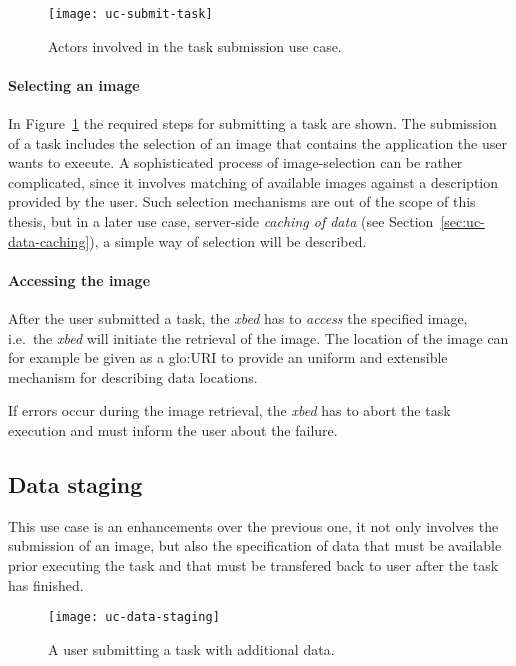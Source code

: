 \begin{figure}[htbp]
  \centering
  \texttt{[image: uc-submit-task]}
  \caption[UC Task submission]{Actors involved  in the task submission use
    case.}
  \label{fig:uc-submit-task}
\end{figure}

\paragraph{Selecting an image}
In  Figure~\ref{fig:uc-submit-task} the  required steps  for  submitting a
task are  shown. The  submission of  a task includes  the selection  of an
image  that  contains  the  application  the user  wants  to  execute.   A
sophisticated process of image-selection  can be rather complicated, since
it involves matching of available images against a description provided by
the user. Such  selection mechanisms are out of the  scope of this thesis,
but  in  a  later  use  case,  server-side  \emph{caching  of  data}  (see
Section~\ref{sec:uc-data-caching}),  a  simple way  of  selection will  be
described.

\paragraph{Accessing the image}
After the user submitted a  task, the \emph{xbed} has to \emph{access} the
specified image,  i.e.~the \emph{xbed} will initiate the  retrieval of the
image.   The  location  of  the  image  can for  example  be  given  as  a
\gls{glo:URI}  to   provide  an  uniform  and   extensible  mechanism  for
describing data locations.

If errors occur  during the image retrieval, the  \emph{xbed} has to abort
the task execution and must inform the user about the failure.

\subsection{Data staging}
\label{sec:uc-data-staging}

This  use case  is an  enhancements  over the  previous one,  it not  only
involves the  submission of an image,  but also the  specification of data
that  must  be  available  prior  executing  the task  and  that  must  be
transfered back to user after the task has finished.

\begin{figure}[htbp]
  \centering
  \texttt{[image: uc-data-staging]}
  \caption[UC  Data  Staging]{A user  submitting  a  task with  additional
    data.}
  \label{fig:uc-data-staging}
\end{figure}

